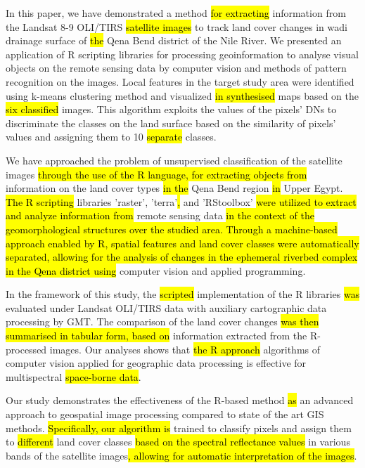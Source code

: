 \documentclass[information,article,submit,pdftex,moreauthors]{Definitions/mdpi}
\begin{document}
In this paper, we have demonstrated a method \hl{for extracting } information from the Landsat 8-9 OLI/TIRS \hl{satellite images }to track land cover changes in wadi drainage surface of \hl{the }Qena Bend district of the Nile River. We presented an application of R scripting libraries for processing geoinformation to analyse visual objects on the remote sensing data by computer vision and methods of pattern recognition on the images. Local features in the target study area were identified using k-means clustering method and visualized \hl{in synthesised } maps based on the \hl{six classified } images. This algorithm exploits the values of the pixels' DNs to discriminate the classes on the land surface based on the similarity of pixels' values and assigning them to 10 \hl{separate }classes. 

We have approached the problem of unsupervised classification of the satellite images \hl{through the use of the R language, for extracting objects from }information on the land cover types \hl{in the } Qena Bend region \hl{in }Upper Egypt. \hl{The R scripting } libraries 'raster', 'terra'\hl{, } and 'RStoolbox' \hl{were utilized to extract and analyze information from }remote sensing data \hl{in the context of the geomorphological structures over the studied area. Through a machine-based approach enabled by R, spatial features and land cover classes were automatically separated, allowing for the analysis of changes in the ephemeral riverbed complex in the Qena district using } computer vision and applied programming.

In the framework of this study, the \hl{scripted }implementation of the R libraries \hl{was }evaluated under Landsat OLI/TIRS data with auxiliary cartographic data processing by GMT. The comparison of the land cover changes \hl{was then summarised in tabular form, based on }information extracted from the R-processed images. Our analyses shows that \hl{the R approach }algorithms of computer vision applied for geographic data processing is effective for multispectral \hl{space-borne data}.

Our study demonstrates the effectiveness of the R-based method \hl{as }an advanced approach to geospatial image processing compared to state of the art GIS methods. \hl{Specifically, our algorithm is } trained to classify pixels and assign them to \hl{different }land cover classes \hl{based on the spectral reflectance values } in various bands of the satellite images\hl{, allowing for automatic interpretation of the images}.
\end{document}
